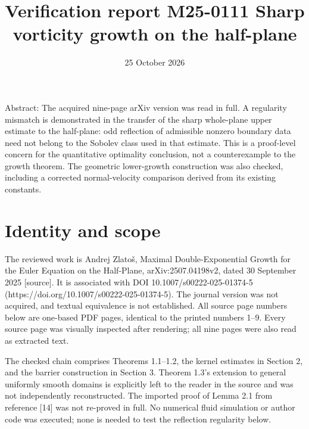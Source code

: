 \documentclass[10pt]{article}
\title{Verification report M25-0111
Sharp vorticity growth on the half-plane}
\author{}
\date{25 October 2026}
\begin{document}
\maketitle
Abstract: The acquired nine-page arXiv version was read in full. A regularity mismatch is demonstrated in the transfer of the sharp whole-plane upper estimate to the half-plane: odd reflection of admissible nonzero boundary data need not belong to the Sobolev class used in that estimate. This is a proof-level concern for the quantitative optimality conclusion, not a counterexample to the growth theorem. The geometric lower-growth construction was also checked, including a corrected normal-velocity comparison derived from its existing constants.\par
\section*{Identity and scope}
The reviewed work is Andrej Zlatoš, Maximal Double-Exponential Growth for the Euler Equation on the Half-Plane, arXiv:2507.04198v2, dated 30 September 2025 [source]. It is associated with DOI 10.1007/s00222-025-01374-5 (https://doi.org/10.1007/s00222-025-01374-5). The journal version was not acquired, and textual equivalence is not established. All source page numbers below are one-based PDF pages, identical to the printed numbers 1–9. Every source page was visually inspected after rendering; all nine pages were also read as extracted text.\par
The checked chain comprises Theorems 1.1–1.2, the kernel estimates in Section 2, and the barrier construction in Section 3. Theorem 1.3’s extension to general uniformly smooth domains is explicitly left to the reader in the source and was not independently reconstructed. The imported proof of Lemma 2.1 from reference [14] was not re-proved in full. No numerical fluid simulation or author code was executed; none is needed to test the reflection regularity below.\par
\end{document}
